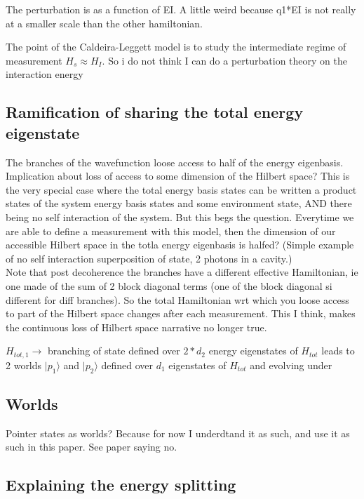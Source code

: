 \documentclass{article}
\begin{document}
The perturbation is as a function of EI.
A little weird because q1*EI is not really at a smaller scale than the other hamiltonian.

The point of the Caldeira-Leggett model is to study the intermediate regime of measurement $H_s\approx H_I$. So i do not think I can do a perturbation theory on the interaction energy

\subsection{Ramification of sharing the total energy eigenstate}
The branches of the wavefunction loose access to half of the energy eigenbasis. 
Implication about loss of access to some dimension of the Hilbert space? 
This is the very special case where the total energy basis states can be written a product states of the system energy basis states and some environment state, AND there being no self interaction of the system.
But this begs the question. Everytime we are able to define a measurement with this model, then the dimension of our accessible Hilbert space in the totla energy eigenbasis is halfed? (Simple example of no self interaction superposition of state, 2 photons in a cavity.) \\
Note that post decoherence the branches have a different effective Hamiltonian, ie one made of the sum of 2 block diagonal terms (one of the block diagonal si different for diff branches). So the total Hamiltonian wrt which you loose access to part of the Hilbert space changes after each measurement. This I think, makes the continuous loss of Hilbert space narrative no longer true. 

$H_{tot,1}\rightarrow$ branching of state defined over $2*d_2$ energy eigenstates of $H_{tot}$ leads to 2 worlds $|p_1\rangle$ and $|p_2\rangle$  defined over $d_1$ eigenstates of $H_{tot}$ and evolving under 



\subsection{Worlds}

Pointer states as worlds? Because for now I underdtand it as such, and use it as such in this paper.
See paper saying no.


\subsection{Explaining the energy splitting}
\end{document}
